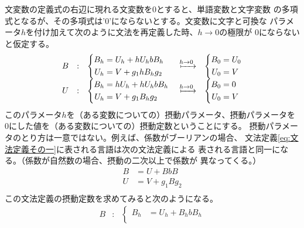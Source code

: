 {	文変数の定義式の右辺に現れる文変数を$0$とすると、単語変数と文字変数
	の多項式となるが、その多項式は'0'にならないとする。文変数に文字と可換な
	パラメータ$h$を付け加えて次のように文法を再定義した時、$h\to0$の極限が
	$0$にならないと仮定する。
	\begin{equation*}\begin{array}{rclcl}
		B &:& \left\{\begin{split}
			B_h &= U_h + hU_hbB_h \\
			U_h &= V + g_1hB_hg_2 \\
		\end{split}\right. &\xmapsto{h\to0}& \left\{\begin{split}
			B_0 &= U_0 \\
			U_0 &= V \\
		\end{split}\right. \\
		U &:& \left\{\begin{split}
			B_h &= hU_h + hU_hbB_h \\
			U_h &= V + g_1B_hg_2 \\
		\end{split}\right. &\xmapsto{h\to0}& \left\{\begin{split}
			B_0 &= 0 \\
			U_0 &= V \\
		\end{split}\right. \\
	\end{array}\end{equation*}
	このパラメータ$h$を（ある変数についての）摂動パラメータ、摂動パラメータを
	$0$にした値を（ある変数についての）摂動定数ということにする。
	摂動パラメータのとり方は一意ではない。例えば、係数がブーリアンの場合、
	文法定義\eqref{eq:文法定義その一}に表される言語は次の文法定義による
	表される言語と同一になる。（係数が自然数の場合、摂動の二次以上で係数が
	異なってくる。）
	\begin{equation*}\begin{split}
		B &= U + BbB \\
		U &= V + g_1Bg_2 \\
	\end{split}\end{equation*}
	この文法定義の摂動定数を求めてみると次のようになる。
	\begin{equation*}\begin{array}{rclcl}
		B &:& \left\{\begin{split}
			B_h &= U_h + B_hbB_h \\

\end{split}
\end{array}
\end{equation*}}
